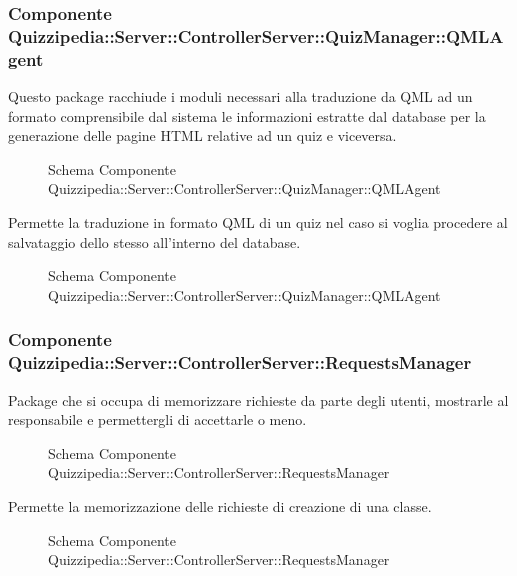 \subsubsection{Componente Quizzipedia::Server::ControllerServer::QuizManager::QMLAgent}
Questo package racchiude i moduli necessari alla traduzione da QML ad un formato comprensibile dal sistema le informazioni estratte dal database per la generazione delle pagine HTML relative ad un quiz e viceversa.
\begin{figure}[H]
\centering
\noindent{}
\caption{Schema Componente Quizzipedia::Server::ControllerServer::QuizManager::QMLAgent}
\end{figure}
Permette la traduzione in formato QML di un quiz nel caso si voglia procedere al salvataggio dello stesso all'interno del database.
\begin{figure}[H]
\centering
\noindent{}
\caption{Schema Componente Quizzipedia::Server::ControllerServer::QuizManager::QMLAgent}
\end{figure}
\subsubsection{Componente Quizzipedia::Server::ControllerServer::RequestsManager}
Package che si occupa di memorizzare richieste da parte degli utenti, mostrarle al responsabile e permettergli di accettarle o meno.
\begin{figure}[H]
\centering
\noindent{}
\caption{Schema Componente Quizzipedia::Server::ControllerServer::RequestsManager}
\end{figure}
Permette la memorizzazione delle richieste di creazione di una classe.
\begin{figure}[H]
\centering
\noindent{}
\caption{Schema Componente Quizzipedia::Server::ControllerServer::RequestsManager}
\end{figure}
